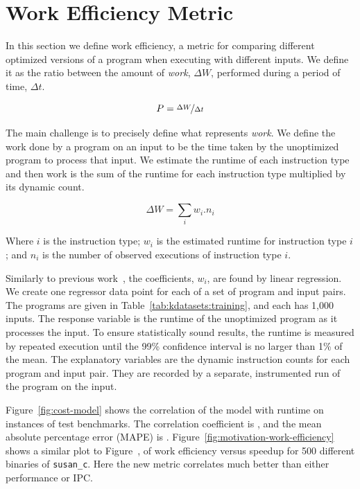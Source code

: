 \section{Work Efficiency Metric} \label{sec:metric}

    In this section we define work efficiency, a metric for comparing different optimized versions of a program when executing with
    different inputs. We define it as the ratio between the amount of \textit{work}, $\Delta W$, performed during a period of time, $\Delta
    t$.

    \[
       P = \nicefrac{\Delta W}{\Delta t}
    \]

    The main challenge is to precisely define what represents \textit{work}. We define the work done by a program on an input to be the
    time taken by the unoptimized program to process that input. We estimate the runtime of each instruction type and then work is the sum
    of the runtime for each instruction type multiplied by its dynamic count.
    
    \[ \Delta W = \sum_i w_i.n_i \]
    
    Where $i$ is the instruction type; $w_i$ is the estimated runtime for instruction type $i$; and $n_i$ is the number of observed
    executions of instruction type $i$.

    Similarly to previous work~\citep{giusto01,powell09,brandolese11}, the coefficients, $w_i$, are found by linear regression. We create
    one regressor data point for each of a set of program and input pairs. The programs are given in Table~\ref{tab:kdatasets:training},
    and each has 1,000 inputs. The response variable is the runtime of the unoptimized program as it processes the input. To ensure
    statistically sound results, the runtime is measured by repeated execution until the 99\% confidence interval is no larger than 1\% of
    the mean. The explanatory variables are the dynamic instruction counts for each program and input pair. They are recorded by a separate,
    instrumented run of the program on the input.

    Figure~\ref{fig:cost-model} shows the correlation of the model with runtime on instances of test benchmarks. The correlation
    coefficient is , and the mean absolute percentage error (MAPE) is . Figure~\ref{fig:motivation-work-efficiency}
    shows a similar plot to Figure~\FIXME{\ref{fig:???}}, of work efficiency versus speedup for 500 different binaries of \texttt{susan\_c}. Here the new metric correlates much better than either performance or IPC.

